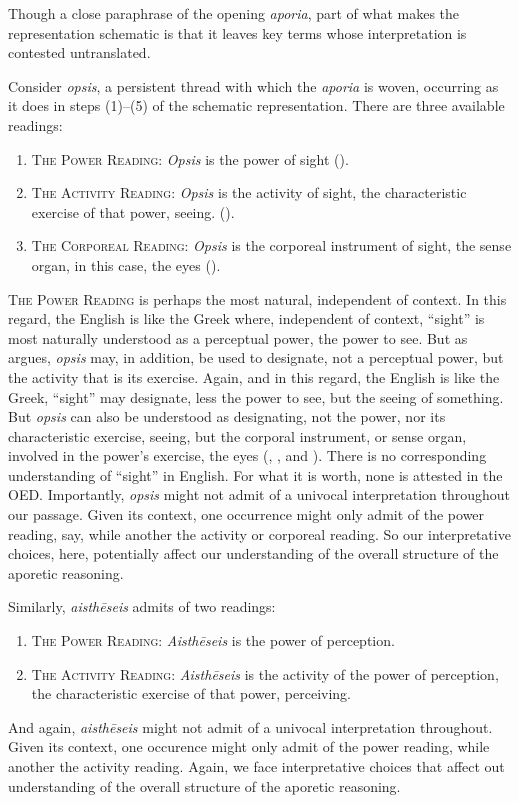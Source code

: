 Though a close paraphrase of the opening \emph{aporia}, part of what makes the representation schematic is that it leaves key terms whose interpretation is contested untranslated. 

Consider \emph{opsis}, a persistent thread with which the \emph{aporia} is woven, occurring as it does in steps (1)–(5) of the schematic representation. There are three available readings:
\begin{enumerate}[(1)]
	\item \textsc{The Power Reading}: \emph{Opsis} is the power of sight (\citealt{Johansen:2005hz}).
	\item \textsc{The Activity Reading}: \emph{Opsis} is the activity of sight, the characteristic exercise of that power, seeing. (\citealt{caston02}).
	\item \textsc{The Corporeal Reading}: \emph{Opsis} is the corporeal instrument of sight, the sense organ, in this case, the eyes (\citealt{Trubowitz:2025aa}).
\end{enumerate}
\textsc{The Power Reading} is perhaps the most natural, independent of context. In this regard, the English is like the Greek where, independent of context, ``sight'' is most naturally understood as a perceptual power, the power to see. But as \citet{caston02} argues, \emph{opsis} may, in addition, be used to designate, not a perceptual power, but the activity that is its exercise. Again, and in this regard, the English is like the Greek, ``sight'' may designate, less the power to see, but the seeing of something. But \emph{opsis} can also be understood as designating, not the power, nor its characteristic exercise, seeing, but the corporal instrument, or sense organ, involved in the power's exercise, the eyes (\citealt[]{Bonitz:1870aa}, \citealt[]{Hicks:1907uq}, and \citealt{Trubowitz:2025aa}). There is no corresponding understanding of ``sight'' in English. For what it is worth, none is attested in the OED. Importantly, \emph{opsis} might not admit of a univocal interpretation throughout our passage. Given its context, one occurrence might only admit of the power reading, say, while another the activity or corporeal reading. So our interpretative choices, here, potentially affect our understanding of the overall structure of the aporetic reasoning.

Similarly, \emph{aisthēseis} admits of two readings:
\begin{enumerate}[(1)]
	\item \textsc{The Power Reading}: \emph{Aisthēseis} is the power of perception.
	\item \textsc{The Activity Reading}: \emph{Aisthēseis} is the activity of the power of perception, the characteristic exercise of that power, perceiving.
\end{enumerate}
And again, \emph{aisthēseis} might not admit of a univocal interpretation throughout. Given its context, one occurence might only admit of the power reading, while another the activity reading. Again, we face interpretative choices that affect out understanding of the overall structure of the aporetic reasoning. 

